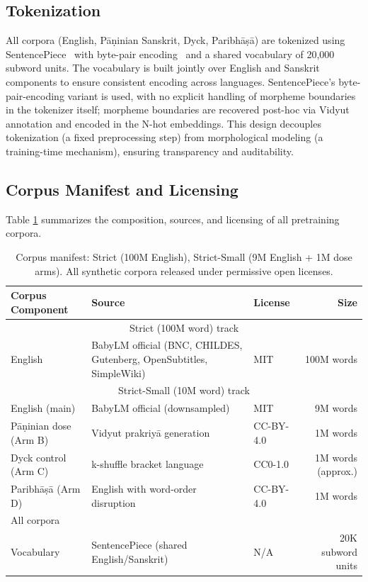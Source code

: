 \subsection{Tokenization}

All corpora (English, Pāṇinian Sanskrit, Dyck, Paribhāṣā) are tokenized using SentencePiece~\cite{Kudo2018SentencePiece} with byte-pair encoding~\cite{Sennrich2016BPE} and a shared vocabulary of 20,000 subword units. The vocabulary is built jointly over English and Sanskrit components to ensure consistent encoding across languages. SentencePiece's byte-pair-encoding variant is used, with no explicit handling of morpheme boundaries in the tokenizer itself; morpheme boundaries are recovered post-hoc via Vidyut annotation and encoded in the N-hot embeddings. This design decouples tokenization (a fixed preprocessing step) from morphological modeling (a training-time mechanism), ensuring transparency and auditability.

\subsection{Corpus Manifest and Licensing}

Table \ref{tab:corpus_manifest} summarizes the composition, sources, and licensing of all pretraining corpora.

\begin{table}[h]
\centering
\small
\begin{tabular}{l p{5.2cm} l r}
\toprule
Corpus Component & Source & License & Size \\
\midrule
\multicolumn{4}{c}{Strict (100M word) track} \\
\midrule
English & BabyLM official (BNC, CHILDES, Gutenberg, OpenSubtitles, SimpleWiki) & MIT & 100M words \\
\midrule
\multicolumn{4}{c}{Strict-Small (10M word) track} \\
\midrule
English (main) & BabyLM official (downsampled) & MIT & 9M words \\
Pāṇinian dose (Arm B) & Vidyut prakriyā generation & CC-BY-4.0 & 1M words \\
Dyck control (Arm C) & k-shuffle bracket language & CC0-1.0 & 1M words (approx.) \\
Paribhāṣā (Arm D) & English with word-order disruption & CC-BY-4.0 & 1M words \\
\midrule
All corpora & & & \\
Vocabulary & SentencePiece (shared English/Sanskrit) & N/A & 20K subword units \\
\bottomrule
\end{tabular}
\caption{Corpus manifest: Strict (100M English), Strict-Small (9M English + 1M dose arms). All synthetic corpora released under permissive open licenses.}
\label{tab:corpus_manifest}
\end{table}

